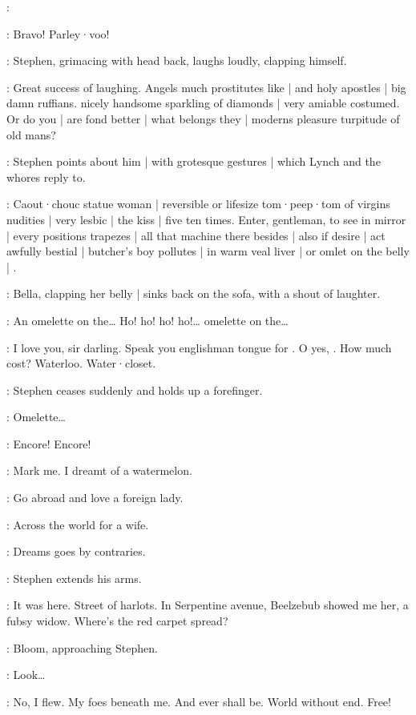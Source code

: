 \Lynch:

\Whores:
Bravo!
Parley·voo!

:
Stephen,
grimacing with head back,
laughs loudly,
clapping himself.

\Stephen:
Great success of laughing.
Angels much prostitutes like |
and holy apostles |
big damn ruffians.
 nicely handsome sparkling of diamonds |
very amiable costumed.
Or do you |
are fond better |
what belongs they |
moderns pleasure turpitude of old mans?

:
Stephen points about him |
with grotesque gestures |
which Lynch and the whores reply to.

\Stephen:
Caout·chouc statue woman |
reversible or lifesize tom·peep·tom of virgins nudities |
very lesbic |
the kiss |
five ten times.
Enter,
gentleman,
to see in mirror |
every positions trapezes |
all that machine there besides |
also if desire |
act awfully bestial |
butcher's boy pollutes |
in warm veal liver |
or omlet on the belly |
.

:
Bella,
clapping her belly |
sinks back on the sofa,
with a shout of laughter.

\Bella:
An omelette on the…
Ho! ho! ho! ho!…
omelette on the…

\Stephen:
I love you,
sir darling.
Speak you englishman tongue for .
O yes,
.
How much cost?
Waterloo.
Water·closet.

:
Stephen ceases suddenly and holds up a forefinger.

\Bella:
Omelette…

\Whores:
Encore! Encore!

\Stephen:
Mark me.
I dreamt of a watermelon.

\Zoe:
Go abroad and love a foreign lady.

\Lynch:
Across the world for a wife.

\Florry:
Dreams goes by contraries.

:
Stephen extends his arms.

\Stephen:
It was here.
Street of harlots.
In Serpentine avenue,
Beelzebub showed me her,
a fubsy widow.
Where's the red carpet spread?

:
Bloom,
approaching Stephen.

\Bloom:
Look…

\Stephen:
No,
I flew.
My foes beneath me.
And ever shall be.
World without end.
Free!


